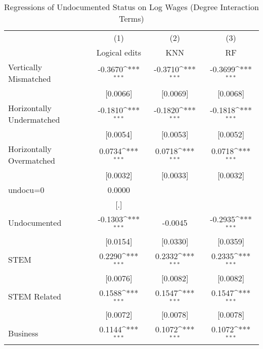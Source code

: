 \begin{table}[htbp]\centering
\def\sym#1{\ifmmode^{#1}\else\(^{#1}\)\fi}
\caption{Regressions of Undocumented Status on Log Wages (Degree Interaction Terms)}
\begin{tabular}{l*{3}{c}}
\toprule
                    &\multicolumn{1}{c}{(1)}         &\multicolumn{1}{c}{(2)}         &\multicolumn{1}{c}{(3)}         \\
                    &Logical edits         &         KNN         &          RF         \\
\midrule
Vertically Mismatched&     -0.3670\sym{***}&     -0.3710\sym{***}&     -0.3699\sym{***}\\
                    &    [0.0066]         &    [0.0069]         &    [0.0068]         \\
\addlinespace
Horizontally Undermatched&     -0.1810\sym{***}&     -0.1820\sym{***}&     -0.1818\sym{***}\\
                    &    [0.0054]         &    [0.0053]         &    [0.0052]         \\
\addlinespace
Horizontally Overmatched&      0.0734\sym{***}&      0.0718\sym{***}&      0.0718\sym{***}\\
                    &    [0.0032]         &    [0.0033]         &    [0.0032]         \\
\addlinespace
undocu=0            &      0.0000         &                     &                     \\
                    &         [.]         &                     &                     \\
\addlinespace
Undocumented        &     -0.1303\sym{***}&     -0.0045         &     -0.2935\sym{***}\\
                    &    [0.0154]         &    [0.0330]         &    [0.0359]         \\
\addlinespace
STEM                &      0.2290\sym{***}&      0.2332\sym{***}&      0.2335\sym{***}\\
                    &    [0.0076]         &    [0.0082]         &    [0.0082]         \\
\addlinespace
STEM Related        &      0.1588\sym{***}&      0.1547\sym{***}&      0.1547\sym{***}\\
                    &    [0.0072]         &    [0.0078]         &    [0.0078]         \\
\addlinespace
Business            &      0.1144\sym{***}&      0.1072\sym{***}&      0.1072\sym{***}\\

\end{tabular}
\end{table}
